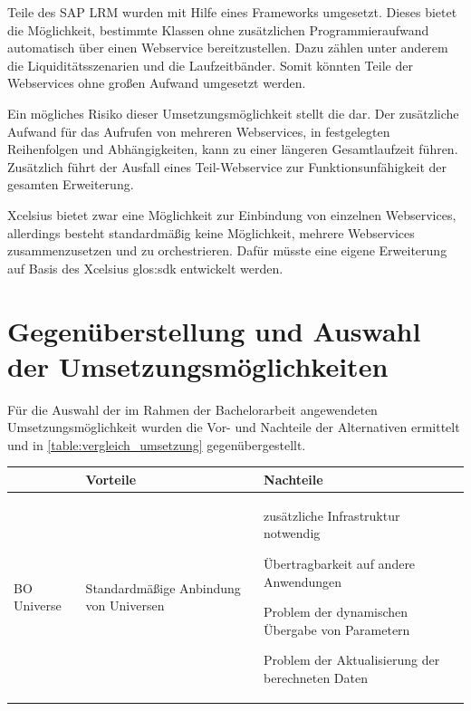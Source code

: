 \begin{onehalfspacing}
Teile des SAP LRM wurden mit Hilfe eines Frameworks umgesetzt. Dieses bietet die Möglichkeit, bestimmte Klassen ohne zusätzlichen Programmieraufwand automatisch über einen Webservice bereitzustellen. Dazu zählen unter anderem die Liquiditätsszenarien und die Laufzeitbänder. Somit könnten Teile der Webservices ohne großen Aufwand umgesetzt werden.

Ein mögliches Risiko dieser Umsetzungsmöglichkeit stellt die  dar. Der zusätzliche Aufwand für das Aufrufen von mehreren Webservices, in festgelegten Reihenfolgen und Abhängigkeiten, kann zu einer längeren Gesamtlaufzeit führen. Zusätzlich führt der Ausfall eines Teil-Webservice zur Funktionsunfähigkeit der gesamten Erweiterung.

\gls{Xcelsius} bietet zwar eine Möglichkeit zur Einbindung von einzelnen Webservices, allerdings besteht standardmäßig keine Möglichkeit, mehrere Webservices zusammenzusetzen und zu orchestrieren. Dafür müsste eine eigene Erweiterung auf Basis des \gls{Xcelsius} \gls{glos:sdk} entwickelt werden.

\section{Gegenüberstellung und Auswahl der Umsetzungsmöglichkeiten}
Für die Auswahl der im Rahmen der Bachelorarbeit angewendeten Umsetzungsmöglichkeit wurden die Vor- und Nachteile der Alternativen ermittelt und in \vref{table:vergleich_umsetzung} gegenübergestellt.

{
\setlength{\extrarowheight}{2pt}
\begin{table}[h]
\centering
\begin{tabular}{| l | >{\centering\arraybackslash} m{5cm} | >{\centering\arraybackslash} m{5cm} |}
\cline{2-3}
\multicolumn{1}{l|}{}	& Vorteile & Nachteile \\	\hline
BO Universe 				&


\begin{seList}
\item Standardmäßige Anbindung von Universen
\end{seList}

&


\begin{seList}
\item zusätzliche Infrastruktur notwendig
\item Übertragbarkeit auf andere Anwendungen
\item Problem der dynamischen Übergabe von Parametern
\item Problem der Aktualisierung der berechneten Daten
\end{seList}



\end{tabular}
\end{table}}
\end{onehalfspacing}
